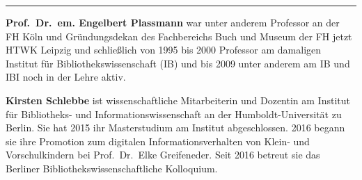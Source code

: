 \begin{center}\rule{0.5\linewidth}{\linethickness}\end{center}

\textbf{Prof.~Dr.~em. Engelbert Plassmann} war unter anderem Professor
an der FH Köln und Gründungsdekan des Fachbereichs Buch und Museum der
FH jetzt HTWK Leipzig und schließlich von 1995 bis 2000 Professor am
damaligen Institut für Bibliothekswissenschaft (IB) und bis 2009 unter
anderem am IB und IBI noch in der Lehre aktiv.

\textbf{Kirsten Schlebbe} ist wissenschaftliche Mitarbeiterin und
Dozentin am Institut für Bibliotheks- und Informationswissenschaft an
der Humboldt-Universität zu Berlin. Sie hat 2015 ihr Masterstudium am
Institut abgeschlossen. 2016 begann sie ihre Promotion zum digitalen
Informationsverhalten von Klein- und Vorschulkindern bei Prof.~Dr.~Elke
Greifeneder. Seit 2016 betreut sie das Berliner
Bibliothekswissenschaftliche Kolloquium.

